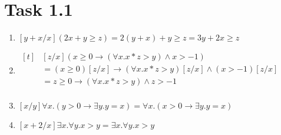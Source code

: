 \documentclass{article}
\author{\hmwkAuthorName}
\date{}
\begin{document}
	
	
	\section{Task 1.1}
	
		\begin{enumerate}[label={(\alph*)}]
			
			\item $[y+x/x](2x + y \geq z) = 2(y + x) + y \geq z = 3y + 2x \geq z$
			
			\item
			$\begin{aligned}[t]
				& [z/x](x \geq 0 \to (\forall x . x * z > y) \land x > -1)\\
				&= (x \geq 0)[z/x] \to (\forall x . x * z > y)[z/x] \land (x > -1)[z/x] \\
				&= z \geq 0 \to (\forall x . x * z > y) \land z > -1 \\
			\end{aligned}$
			
			\item $[x/y]\forall x . (y > 0 \to \exists y . y = x) = \forall x . (x > 0 \to \exists y . y = x)$
			
			\item $[x+2/x]\exists x . \forall y . x > y = \exists x . \forall y . x > y$
			
		\end{enumerate}
	
\end{document}
